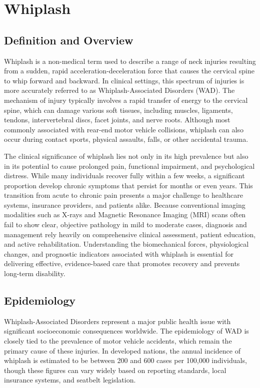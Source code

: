\chapter{Whiplash}

\section*{Definition and Overview}
Whiplash is a non-medical term used to describe a range of neck injuries resulting from a sudden, rapid acceleration-deceleration force that causes the cervical spine to whip forward and backward. In clinical settings, this spectrum of injuries is more accurately referred to as Whiplash-Associated Disorders (WAD). The mechanism of injury typically involves a rapid transfer of energy to the cervical spine, which can damage various soft tissues, including muscles, ligaments, tendons, intervertebral discs, facet joints, and nerve roots. Although most commonly associated with rear-end motor vehicle collisions, whiplash can also occur during contact sports, physical assaults, falls, or other accidental trauma.

The clinical significance of whiplash lies not only in its high prevalence but also in its potential to cause prolonged pain, functional impairment, and psychological distress. While many individuals recover fully within a few weeks, a significant proportion develop chronic symptoms that persist for months or even years. This transition from acute to chronic pain presents a major challenge to healthcare systems, insurance providers, and patients alike. Because conventional imaging modalities such as X-rays and Magnetic Resonance Imaging (MRI) scans often fail to show clear, objective pathology in mild to moderate cases, diagnosis and management rely heavily on comprehensive clinical assessment, patient education, and active rehabilitation. Understanding the biomechanical forces, physiological changes, and prognostic indicators associated with whiplash is essential for delivering effective, evidence-based care that promotes recovery and prevents long-term disability.

\section*{Epidemiology}
Whiplash-Associated Disorders represent a major public health issue with significant socioeconomic consequences worldwide. The epidemiology of WAD is closely tied to the prevalence of motor vehicle accidents, which remain the primary cause of these injuries. In developed nations, the annual incidence of whiplash is estimated to be between 200 and 600 cases per 100,000 individuals, though these figures can vary widely based on reporting standards, local insurance systems, and seatbelt legislation.

